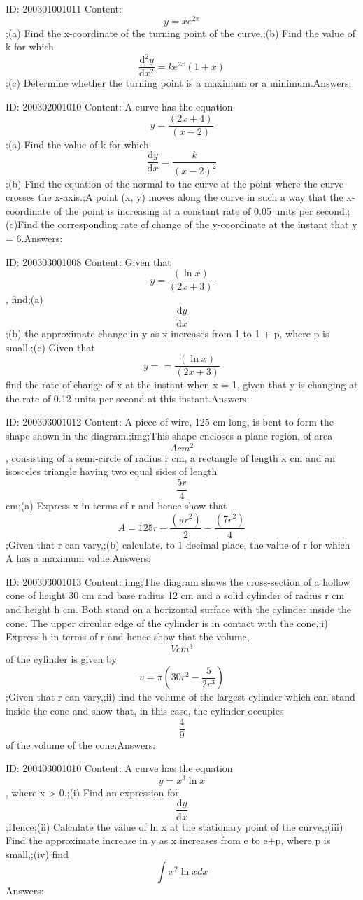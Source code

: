 \documentclass{article}
\begin{document}
ID: 200301001011
Content:
$$y=xe^{2x}$$;(a)	Find the x-coordinate of the turning point of the curve.;(b)	Find the value of k for which $$\frac{\mathrm{d} ^{2}y}{\mathrm{d} x^{2}}=ke^{2x}(1+x)$$;(c)	Determine whether the turning point is a maximum or a minimum.Answers:

ID: 200302001010
Content:
A curve has the equation $$ y=\frac{(2x+4)}{(x-2)}$$;(a)	Find the value of k for which $$ \frac{\mathrm{d} y}{\mathrm{d} x}=\frac{k}{(x-2)^2} $$;(b)	Find the equation of the normal to the curve at the point where the curve crosses the x-axis.;A point (x, y) moves along the curve in such a way that the x-coordinate of the point is increasing at a constant rate of 0.05 units per second.;(c)Find the corresponding rate of change of the y-coordinate at the instant that y = 6.Answers:

ID: 200303001008
Content:
Given that $$y=\frac{(\ln x)}{(2x+3)}$$, find;(a)	$$\frac{\mathrm{d} y}{\mathrm{d} x}$$;(b)	the approximate change in y as x increases from 1 to 1 + p, where p is small.;(c)	Given that $$y==\frac{(\ln x)}{(2x+3)}$$ find the rate of change of x at the instant when x = 1, given that y is changing at the rate of 0.12 units per second at this instant.Answers:

ID: 200303001012
Content:
A piece of wire, 125 cm long, is bent to form the shape shown in the diagram.;img;This shape encloses a plane region, of area $$A cm^2$$, consisting of a semi-circle of radius r cm, a rectangle of length x cm and an isosceles triangle having two equal sides of length $$\frac{5r}{4}$$ cm;(a)	Express x in terms of r and hence show that $$A=125r-\frac{(\pi r^2)}{2}-\frac{(7r^2)}{4}$$ ;Given that r can vary,;(b) calculate, to 1 decimal place, the value of r for which A has a maximum value.Answers:

ID: 200303001013
Content:
img;The diagram shows the cross-section of a hollow cone of height 30 cm and base radius 12 cm and a solid cylinder of radius r cm and height h cm. Both stand on a horizontal surface with the cylinder inside the cone. The upper circular edge of the cylinder is in contact with the cone,;i) Express h in terms of r and hence show that the volume, $$V cm^3$$ of the cylinder is given by $$v=\pi(30r^2-\frac{5}{2r^3})$$;Given that r can vary,;ii) find the volume of the largest cylinder which can stand inside the cone and show that, in this case, the cylinder occupies $$\frac{4}{9}$$ of the volume of the cone.Answers:

ID: 200403001010
Content:
A curve has the equation $$y=x^3\ln x$$, where x > 0.;(i)	Find an expression for $$\frac{\mathrm{d} y}{\mathrm{d} x}$$;Hence;(ii) Calculate the value of ln x at the stationary point of the curve,;(iii) Find the approximate increase in y as x increases from e to e+p, where p is small,;(iv) find $$\int x^2\ln x dx$$Answers:
\end{document}
